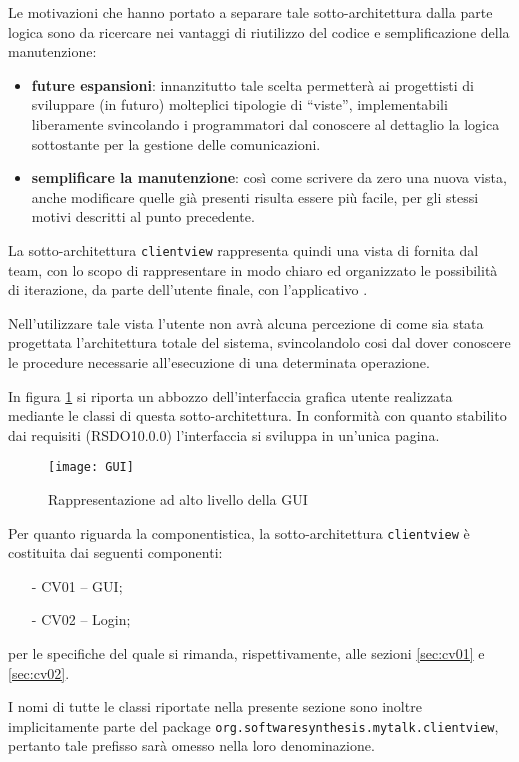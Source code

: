 Le motivazioni che hanno portato a separare tale sotto-architettura dalla parte logica sono da ricercare nei vantaggi di riutilizzo del codice e semplificazione della manutenzione:
\begin{itemize}
 	\item \textbf{future espansioni}: innanzitutto tale scelta permetterà ai progettisti di sviluppare (in futuro) molteplici tipologie di ``viste'', implementabili liberamente svincolando i programmatori dal conoscere al dettaglio la logica sottostante per la gestione delle comunicazioni.
 	\item \textbf{semplificare la manutenzione}: così come scrivere da zero una nuova vista, anche modificare quelle già presenti risulta essere più facile, per gli stessi motivi descritti al punto precedente.
\end{itemize}

La sotto-architettura \texttt{clientview} rappresenta quindi una vista di  fornita dal team, con lo scopo di rappresentare in modo chiaro ed organizzato le possibilità di iterazione, da parte dell'utente finale, con l'applicativo \caName.

Nell'utilizzare tale vista l'utente non avrà alcuna percezione di come sia stata progettata l'architettura totale del sistema, svincolandolo cosi dal dover conoscere le procedure necessarie all'esecuzione di una determinata operazione.

In figura \ref{fig:gui} si riporta un abbozzo dell'interfaccia grafica utente realizzata mediante le classi di questa sotto-architettura. In conformità con quanto stabilito dai requisiti (RSDO10.0.0) l'interfaccia si sviluppa in un'unica pagina.

\begin{figure}[h]
  \centering
  \texttt{[image: GUI]}
  \caption{Rappresentazione ad alto livello della GUI}\label{fig:gui}
\end{figure}

Per quanto riguarda la componentistica, la sotto-architettura \texttt{clientview} è costituita dai seguenti componenti:
\begin{itemize}[noitemsep,nolistsep]
  \item[-] \textsf{CV01 -- GUI};
  \item[-] \textsf{CV02 -- Login};
\end{itemize}
per le specifiche del quale si rimanda, rispettivamente, alle sezioni \ref{sec:cv01} e \ref{sec:cv02}.

I nomi di tutte le classi riportate nella presente sezione sono inoltre implicitamente parte del package \texttt{org.softwaresynthesis.mytalk.clientview}, pertanto tale prefisso sarà omesso nella loro denominazione.

